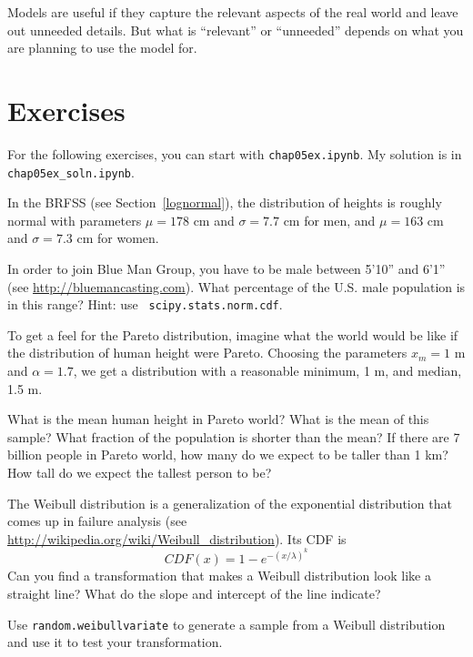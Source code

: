 \documentclass[12pt]{book}
\begin{document}
Models are useful if they capture the relevant aspects of the
real world and leave out unneeded details.  But what is ``relevant''
or ``unneeded'' depends on what you are planning to use the model
for.


\section{Exercises}

For the following exercises, you can start with \verb"chap05ex.ipynb".
My solution is in \verb"chap05ex_soln.ipynb".

\begin{exercise}
In the BRFSS (see Section~\ref{lognormal}), the distribution of
heights is roughly normal with parameters $\mu = 178$ cm and
$\sigma = 7.7$ cm for men, and $\mu = 163$ cm and $\sigma = 7.3$ cm for
women.

In order to join Blue Man Group, you have to be male between 5'10''
and 6'1'' (see \url{http://bluemancasting.com}).  What percentage of
the U.S. male population is in this range?  Hint: use {\tt
  scipy.stats.norm.cdf}.

\end{exercise}


\begin{exercise}
To get a feel for the Pareto distribution, imagine what the world
would be like if the distribution of human height were Pareto.
Choosing the parameters $x_{m} = 1$ m and $\alpha = 1.7$, we
get a distribution with a reasonable minimum, 1 m,
and median, 1.5 m.

What is the mean human height in Pareto world?  What is the mean of
this sample?  What fraction of the population is shorter than the
mean?  If there are 7 billion people in Pareto world, how many do we
expect to be taller than 1 km?  How tall do we expect the tallest
person to be?

\end{exercise}


\begin{exercise}
\label{weibull}

The Weibull distribution is a generalization of the exponential
distribution that comes up in failure analysis
(see \url{http://wikipedia.org/wiki/Weibull_distribution}).  Its CDF is
%
\[ CDF(x) = 1 - e^{-(x / \lambda)^k} \]
%
Can you find a transformation that makes a Weibull distribution look
like a straight line?  What do the slope and intercept of the
line indicate?

Use {\tt random.weibullvariate} to generate a sample from a
Weibull distribution and use it to test your transformation.

\end{exercise}
\end{document}
